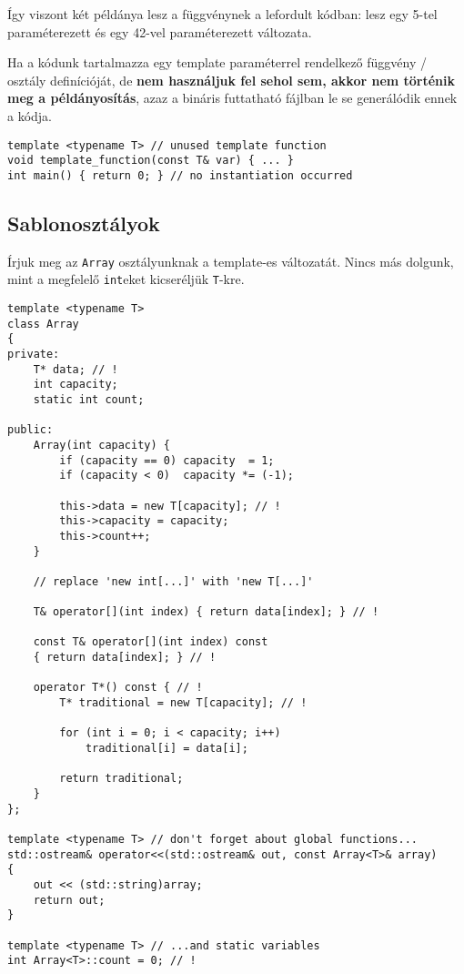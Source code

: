 \documentclass[a4paper, 11pt, oneside]{book}
\begin{document}
Így viszont két példánya lesz a függvénynek a lefordult kódban: lesz egy 5-tel paraméterezett és egy 42-vel paraméterezett változata.

Ha a kódunk tartalmazza egy template paraméterrel rendelkező függvény / osztály definícióját, de \textbf{nem használjuk fel sehol sem, akkor nem történik meg a példányosítás}, azaz a bináris futtatható fájlban le se generálódik ennek a kódja.

\begin{lstlisting}[style=cppstyle]
template <typename T> // unused template function
void template_function(const T& var) { ... }
int main() { return 0; } // no instantiation occurred
\end{lstlisting}

\subsection{Sablonosztályok}

Írjuk meg az \verb*|Array| osztályunknak a template-es változatát. Nincs más dolgunk, mint a megfelelő \verb*|int|eket kicseréljük \verb*|T|-kre.

\begin{lstlisting}[style=cppstyle]
template <typename T>
class Array 
{
private:
	T* data; // !
	int capacity;
	static int count;

public:
	Array(int capacity) {
		if (capacity == 0) capacity  = 1;
		if (capacity < 0)  capacity *= (-1);
		
		this->data = new T[capacity]; // !
		this->capacity = capacity;
		this->count++;
	}

	// replace 'new int[...]' with 'new T[...]'
	
	T& operator[](int index) { return data[index]; } // !
	
	const T& operator[](int index) const 
	{ return data[index]; } // !
	
	operator T*() const { // !
		T* traditional = new T[capacity]; // !
		
		for (int i = 0; i < capacity; i++)
			traditional[i] = data[i];
		
		return traditional;
	}
};

template <typename T> // don't forget about global functions...
std::ostream& operator<<(std::ostream& out, const Array<T>& array) 
{
	out << (std::string)array;
	return out;
}

template <typename T> // ...and static variables
int Array<T>::count = 0; // !
\end{lstlisting}
\end{document}
